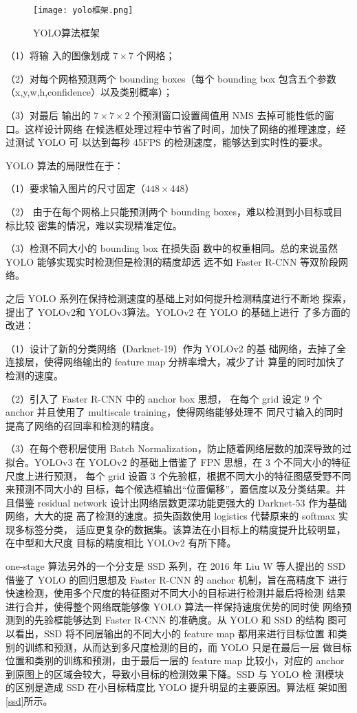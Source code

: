 \begin{figure}[htbp]
    \centering
    \texttt{[image: yolo框架.png]}
    \caption{YOLO算法框架}
    \label{yk}
\end{figure}

（1）将输
入的图像划成 $7 \times 7$ 个网格；

（2）对每个网格预测两个 bounding boxes（每个
bounding box 包含五个参数（x,y,w,h,confidence）以及类别概率）；

（3）对最后
输出的 $7 \times 7 \times 2$ 个预测窗口设置阈值用 NMS 去掉可能性低的窗口。这样设计网络
在候选框处理过程中节省了时间，加快了网络的推理速度，经过测试 YOLO 可
以达到每秒 45FPS 的检测速度，能够达到实时性的要求。

YOLO 算法的局限性在于：

（1）要求输入图片的尺寸固定（$448 \times 448$）

（2）
由于在每个网格上只能预测两个 bounding boxes，难以检测到小目标或目标比较
密集的情况，难以实现精准定位。

（3）检测不同大小的 bounding box 在损失函
数中的权重相同。总的来说虽然 YOLO 能够实现实时检测但是检测的精度却远
远不如 Faster R-CNN 等双阶段网络。

之后 YOLO 系列在保持检测速度的基础上对如何提升检测精度进行不断地
探索，提出了 YOLOv2\cite{redmon2017yolo9000}和 YOLOv3\cite{redmon2018yolov3}算法。YOLOv2 在 YOLO 的基础上进行
了多方面的改进：

（1）设计了新的分类网络（Darknet-19）作为 YOLOv2 的基
础网络，去掉了全连接层，使得网络输出的 feature map 分辨率增大，减少了计
算量的同时加快了检测的速度。

（2）引入了 Faster R-CNN 中的 anchor box 思想，
在每个 grid 设定 9 个 anchor 并且使用了 multiscale training，使得网络能够处理不
同尺寸输入的同时提高了网络的召回率和检测的精度。

（3）在每个卷积层使用
Batch Normalization，防止随着网络层数的加深导致的过拟合。YOLOv3 在
YOLOv2 的基础上借鉴了 FPN 思想，在 3 个不同大小的特征尺度上进行预测，
每个 grid 设置 3 个先验框，根据不同大小的特征图感受野不同来预测不同大小的
目标，每个候选框输出“位置偏移”，置信度以及分类结果。并且借鉴 residual
network 设计出网络层数更深功能更强大的 Darknet-53 作为基础网络，大大的提
高了检测的速度。损失函数使用 logistics 代替原来的 softmax 实现多标签分类，
适应更复杂的数据集。该算法在小目标上的精度提升比较明显，在中型和大尺度
目标的精度相比 YOLOv2 有所下降。

one-stage 算法另外的一个分支是 SSD 系列，在 2016 年 Liu W 等人提出的
SSD\cite{liu2016ssd}借鉴了 YOLO 的回归思想及 Faster R-CNN 的 anchor 机制，旨在高精度下
进行快速检测，使用多个尺度的特征图对不同大小的目标进行检测并最后将检测
结果进行合并，使得整个网络既能够像 YOLO 算法一样保持速度优势的同时使
网络预测到的先验框能够达到 Faster R-CNN 的准确度。从 YOLO 和 SSD 的结构
图可以看出，SSD 将不同层输出的不同大小的 feature map 都用来进行目标位置
和类别的训练和预测，从而达到多尺度检测的目的，而 YOLO 只是在最后一层
做目标位置和类别的训练和预测，由于最后一层的 feature map 比较小，对应的
anchor 到原图上的区域会较大，导致小目标的检测效果下降。SSD 与 YOLO 检
测模块的区别是造成 SSD 在小目标精度比 YOLO 提升明显的主要原因。算法框
架如图\ref{ssd}所示。

